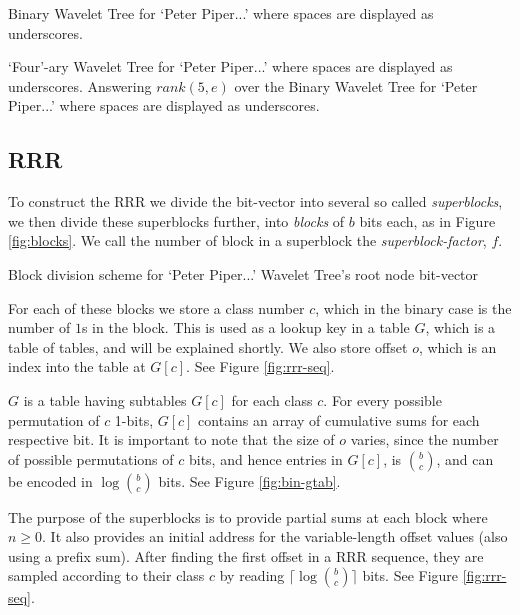 			{Binary Wavelet Tree for `Peter Piper...' where spaces are displayed
			as underscores.}
			
			{`Four'-ary Wavelet Tree for `Peter Piper...' where spaces are 
			displayed as underscores.}
\clearpage
			{Answering $rank(5, e)$ over the Binary Wavelet Tree for `Peter
			Piper...' where spaces are displayed as underscores.}

\subsection{RRR}
To construct the RRR we divide the bit-vector into several so called 
\emph{superblocks}, we then divide these superblocks further, into 
\emph{blocks} of $b$ bits each, as in Figure \ref{fig:blocks}. We call the 
number of block in a superblock the \emph{superblock-factor}, $f$.

			{Block division scheme for `Peter Piper...' Wavelet Tree's root
			node bit-vector}

For each of these blocks we store a class number $c$, which in the binary case 
is the number of  $1$s in the block. This is used as a lookup key in a table 
$G$, which is a table of tables, and will be explained shortly. We also store 
offset $o$, which is an index into the table at $G[c]$. See Figure 
\ref{fig:rrr-seq}.

$G$ is a table having subtables $G[c]$ for each class $c$. For every possible 
permutation of $c$ 1-bits, $G[c]$ contains an array of cumulative sums for each 
respective bit. It is important to note that the size of $o$ varies, since 
the number of possible permutations of $c$ bits, and hence entries in $G[c]$, is $b \choose c$, and can be encoded in $\log {b \choose c}$ bits. See Figure \ref{fig:bin-gtab}.

The purpose of the superblocks is to provide partial sums at each block where $n 
\ge 0$. It also provides an initial address for the variable-length offset 
values (also using a prefix sum). After finding the first offset in a RRR
sequence, they are sampled according to their class $c$ by reading $\lceil\log 
{b \choose c}\rceil$ bits. See Figure \ref{fig:rrr-seq}.

